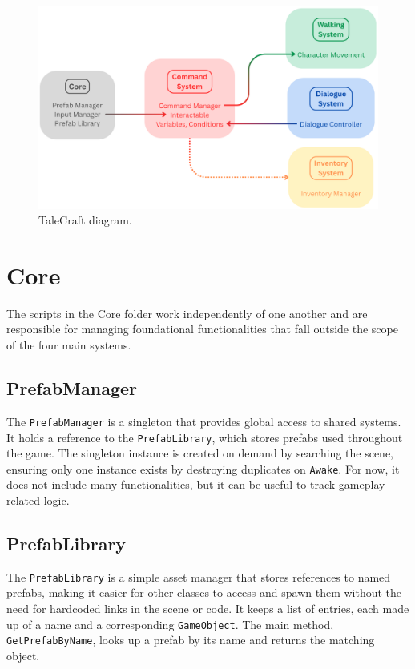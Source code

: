 \begin{figure}[H]
\centering
\includegraphics[width=0.85\linewidth]{img/Everything2.png}
\caption{TaleCraft diagram.}
\label{fig:TaleCraft}
\end{figure}

\section{Core}
\label{Core}
The scripts in the Core folder work independently of one another and are responsible for managing foundational functionalities that fall outside the scope of the four main systems. 

\subsection{PrefabManager}
The \verb|PrefabManager| is a singleton that provides global access to shared systems. It holds a reference to the \verb|PrefabLibrary|, which stores prefabs used throughout the game. The singleton instance is created on demand by searching the scene, ensuring only one instance exists by destroying duplicates on \verb|Awake|. For now, it does not include many functionalities, but it can be useful to track gameplay-related logic.

\subsection{PrefabLibrary}
The \verb|PrefabLibrary| is a simple asset manager that stores references to named prefabs, making it easier for other classes to access and spawn them without the need for hardcoded links in the scene or code. It keeps a list of entries, each made up of a name and a corresponding \verb|GameObject|. The main method, \verb|GetPrefabByName|, looks up a prefab by its name and returns the matching object.

